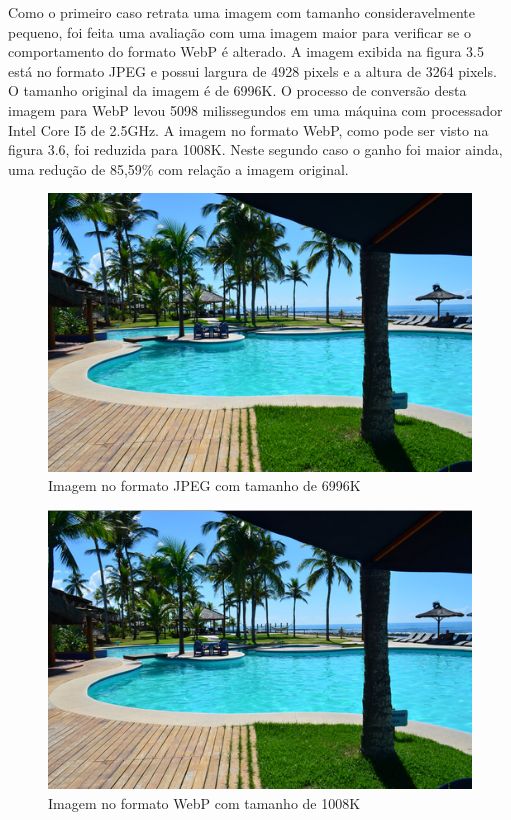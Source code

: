 \documentclass[espaco=simples,appendix=Name]{abnt}
\begin{document}
Como o primeiro caso retrata uma imagem com tamanho consideravelmente pequeno, foi feita uma avaliação com uma imagem maior para verificar se o comportamento do formato WebP é alterado. A imagem exibida na figura 3.5 está no formato JPEG e possui largura de 4928 pixels e a altura de 3264 pixels. O tamanho original da imagem é de 6996K. O processo de conversão desta imagem para WebP levou 5098 milissegundos em uma máquina com processador Intel Core I5 de 2.5GHz. A imagem no formato WebP, como pode ser visto na figura 3.6, foi reduzida para 1008K. Neste segundo caso o ganho foi maior ainda, uma redução de 85,59\% com relação a imagem original.

\begin{figure}[h]
  \centering
    \includegraphics[scale=0.5]{Imagem2JPEG.png}
  \caption{Imagem no formato JPEG com tamanho de 6996K}
\end{figure}

\begin{figure}[h]
  \centering
    \includegraphics[scale=0.5]{Imagem2WEBP.png}
  \caption{Imagem no formato WebP com tamanho de 1008K}
\end{figure}
\end{document}
